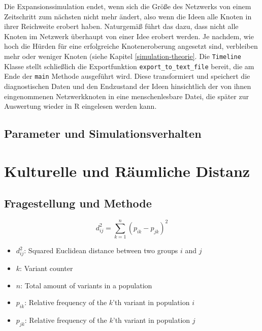 \documentclass[openany,twoside,twocolumn]{book}
\providecommand{\tightlist}{%
  \setlength{\itemsep}{0pt}\setlength{\parskip}{0pt}}
\begin{document}
Die Expansionssimulation endet, wenn sich die Größe des Netzwerks von
einem Zeitschritt zum nächsten nicht mehr ändert, also wenn die Ideen
alle Knoten in ihrer Reichweite erobert haben. Naturgemäß führt das
dazu, dass nicht alle Knoten im Netzwerk überhaupt von einer Idee
erobert werden. Je nachdem, wie hoch die Hürden für eine erfolgreiche
Knoteneroberung angesetzt sind, verbleiben mehr oder weniger Knoten
(siehe Kapitel \ref{simulation-theorie}. Die \texttt{Timeline} Klasse
stellt schließlich die Exportfunktion \texttt{export\_to\_text\_file}
bereit, die am Ende der \texttt{main} Methode ausgeführt wird. Diese
transformiert und speichert die diagnostischen Daten und den Endzustand
der Ideen hinsichtlich der von ihnen eingenommenen Netzwerkknoten in
eine menschenlesbare Datei, die später zur Auswertung wieder in R
eingelesen werden kann.

\hypertarget{simulation-parameters}{%
\subsection{Parameter und
Simulationsverhalten}\label{simulation-parameters}}

\hypertarget{kulturelle-und-raumliche-distanz}{%
\section{Kulturelle und Räumliche
Distanz}\label{kulturelle-und-raumliche-distanz}}

\hypertarget{fragestellung-und-methode}{%
\subsection{Fragestellung und Methode}\label{fragestellung-und-methode}}

\[d_{ij}^2 = \sum_{k = 1}^{n} (p_{ik} - p_{jk})^2\]

\begin{itemize}
\tightlist
\item
  \(d_{ij}^2\): Squared Euclidean distance between two groups \(i\) and
  \(j\)
\item
  \(k\): Variant counter
\item
  \(n\): Total amount of variants in a population
\item
  \(p_{ik}\): Relative frequency of the \(k\)'th variant in population
  \(i\)
\item
  \(p_{jk}\): Relative frequency of the \(k\)'th variant in population
  \(j\)
\end{itemize}
\end{document}
